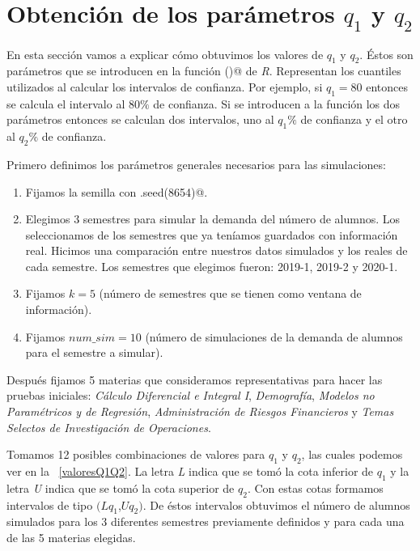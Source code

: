 \section{Obtención de los parámetros $q_{1}$ y $q_{2}$}

En esta sección vamos a explicar cómo obtuvimos los valores de $q_{1}$ y $q_{2}$. Éstos son parámetros que se introducen en la función \verb@hw()@ de \textit{R}. Representan los cuantiles utilizados al calcular los intervalos de confianza. Por ejemplo, si $q_{1} = 80$ entonces se calcula el intervalo al $80\%$ de confianza. Si se introducen a la función los dos parámetros entonces se calculan dos intervalos, uno al $q_{1}\%$ de confianza y el otro al $q_{2}\%$ de confianza.

Primero definimos los parámetros generales necesarios para las simulaciones:
  
  \begin{enumerate}
\item Fijamos la semilla con \verb@set.seed(8654)@.

\item Elegimos 3 semestres para simular la demanda del número de alumnos. Los seleccionamos de los semestres que ya teníamos guardados con información real. Hicimos una comparación entre nuestros datos simulados y los reales de cada semestre. Los semestres que elegimos fueron: 2019-1, 2019-2 y 2020-1.

\item Fijamos $k = 5$ (número de semestres que se tienen como ventana de información).

\item Fijamos $num\_sim = 10$ (número de simulaciones de la demanda de alumnos para el semestre a simular).
\end{enumerate}


Después fijamos 5 materias que consideramos representativas para hacer las pruebas iniciales: \textit{Cálculo Diferencial e Integral I}, \textit{Demografía}, \textit{Modelos no Paramétricos y de Regresión}, \textit{Administración de Riesgos Financieros} y \textit{Temas Selectos de Investigación de Operaciones}.

Tomamos 12 posibles combinaciones de valores para $q_{1}$ y $q_{2}$, las cuales podemos ver en la \tablename{~\ref{valoresQ1Q2}}. La letra \textit{L} indica que se tomó la cota inferior de $q_{1}$ y la letra \textit{U} indica que se tomó la cota superior de $q_{2}$. Con estas cotas formamos intervalos de tipo $(Lq_{1}$,$Uq_{2})$. De éstos intervalos obtuvimos el número de alumnos simulados para los 3 diferentes semestres previamente definidos y para cada una de las 5 materias elegidas.

